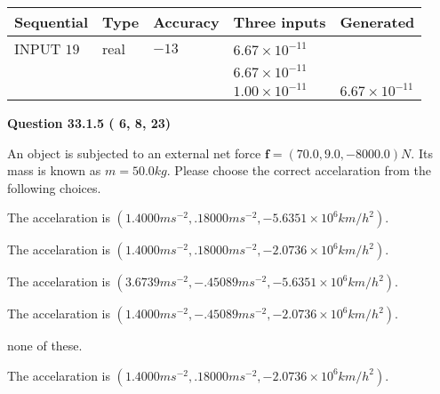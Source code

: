 \documentclass[12pt]{article}
\begin{document}
   
  
  
\noindent\begin{tabular}{|l|l|l|l|l|}
\hline
 Sequential & Type & Accuracy & Three inputs & Generated \\ 
\hline
 
 
  INPUT $          19$ & real & $         -13 $ & $
 6.67 \times 10^{-11}
  $ & \\
  & & &  $
 6.67 \times 10^{-11}
  $ & \\
  & & &  $
 1.00 \times 10^{-11}
 $ & $ 6.67 \times 10^{-11} $ 
 \\  \hline  
 \end{tabular}
   
   
  
\vspace{0.2in}
  
{\textbf{\Large{Question
33.1.5 
 (          6,          8,         23)
}}}
  
  
 
An object is subjected to an external net force $\mathbf{f}=(
70.0 ,
9.0,
-8000.0  )N$. Its mass is known as
$m= %
50.0  kg$. Please choose the correct accelaration
from the following choices.
 
 
 
The accelaration is
$(
1.4000ms^{-2},
.18000ms^{-2},
-5.6351 \times 10^{6}km/h^2
).
$
 
 
The accelaration is
$(
1.4000ms^{-2},
.18000ms^{-2},
-2.0736 \times 10^{6}km/h^2
).
$
 
 
The accelaration is
$(
3.6739ms^{-2},
-.45089ms^{-2},
-5.6351 \times 10^{6}km/h^2
).
$
 
 
The accelaration is
$(
1.4000ms^{-2},
-.45089ms^{-2},
-2.0736 \times 10^{6}km/h^2
).
$
 
 
none of these.
 
 
\noindent{}
 
 
The accelaration is
$(
1.4000ms^{-2},
.18000ms^{-2},
-2.0736 \times 10^{6}km/h^2
).
$
 
 
\noindent{}
 
 
 
 
 
 
\noindent{}
 
\end{document}
